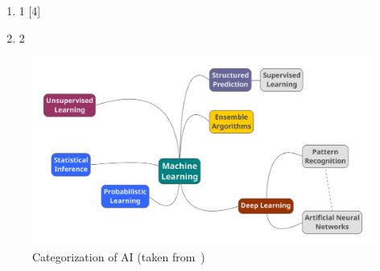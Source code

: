 \begin{enumerate}
 \item 1 [4]
 \item 2
\end{enumerate}


\begin{figure}[htbp]
  \centering
  \includegraphics[width=\textwidth]{images/ai-categorization}
  \caption{Categorization of \ac{AI} (taken from~\cite{})}
  \label{fig:ai-categorization}
\end{figure}

\endinput

Machine Learning has become a topic of interest because of its large field of application. Artificial intelligence is a broad area of knowledge comprised with several branches where each one has a different configuration and purpose. As a result, we consider one question: what field should a new user start working with if the goal is to classify information from a specific data set, what field is more appropriate for pattern recognition? Our work responds to this question based on empirical experimentation where we identified that approaching Machine Learning through supervised linear regression models allows users to understand the basic applications while fulfilling their data classification objective. Furthermore, we were able to recognize Neural Networks as a good source to classify patters in an effective and approachable way. Moreover, due to available resources such as high level TensorFlow Estimator API and the column-oriented data analysis API Pandas learning doesn’t require long before the user can start working on Machine Learning projects. 